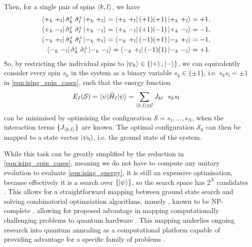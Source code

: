 Then, for a single pair of spins ${ \langle k, l \rangle }$, we have
\begin{equation}
    \label{eqn:ising_spin_cases}
    \begin{split}
        \bra{+_{k} \ +_{l} } \hat{\sigma}^{z}_{k} \ \hat{\sigma}^z_{l}  \ket{+_{k} \ +_{l} } =  \bra{+_{k} \ +_{l} } (+1)(+1) \ket{+_{k} \ +_{l} } = +1, \\
        \bra{+_{k} \ -_{l} } \hat{\sigma}^{z}_{k} \ \hat{\sigma}^z_{l} \ket{+_{k} \ -_{l} } = \bra{+_{k} \ -_{l} } (+1)(-1) \ket{+_{k} \ -_{l} } = -1 , \\
        \bra{-_{k} \ +_{l} } \hat{\sigma}^{z}_{k} \ \hat{\sigma}^z_{l} \ket{-_{k} \ +_{l} } = \bra{-_{k} \ +_{l} } (-1)(+1) \ket{-_{k} \ +_{l} } = -1, \\
        \bra{-_{k} \ -_{l} } \hat{\sigma}^{z}_{k} \ \hat{\sigma}^z_{l} \ket{-_{k} \ -_{l} } = \bra{-_{k} \ +_{l} } (-1)(1) \ket{-_{k} \ -_{l} } = +1. \\
    \end{split}
\end{equation}
So, by restricting the individual spins to $\ket{\psi_k} \in \{\ket{+}, \ket{-}\}$, 
    we can equivalently consider every spin $s_k$ in the system
    as a binary variable $s_k \in \{\pm 1\}$,
    i.e. $s_k s_l = \pm 1$ in \cref{eqn:ising_spin_cases},
    such that the energy function
\begin{equation}
    \label{eqn:ising_energy}
    E_I(\mathcal{S}) = \braket{ \psi | \hat{H}_I | \psi } = \sum\limits_{{ \langle k, l \rangle } \in { \mathcal{C}}} J_{kl} \ \ s_k s_l
\end{equation}
    can be minimised by optimising the configuration $\mathcal{S} = s_1, \dots, s_N$, when the interaction terms $\{J_{{ \langle k, l \rangle }}\}$ are known.
The optimal configuration $\mathcal{S}_0$ can then be mapped to a 
    state vector $\ket{\psi_0}$, i.e. the ground state of the system. 
\par 

While this task can be greatly simplified by the reduction in \cref{eqn:ising_spin_cases}, 
    meaning we do not have to compute any unitary evolution to evaluate \cref{eqn:ising_energy},
    it is still an expensive optimisation, because effectively it is a search over $\{ \ket{\psi }\}$, 
    so the search space has $2^N$ candidates \cite{onsager1944crystal, barahona1982computational}. 
This allows for a straightforward mapping between ground state search 
    and solving combinatorial optimsiation algorithms, namely , 
    known to be NP-complete \cite{garey1979computers}, 
    allowing for proposed advantage in mapping computationally challenging problems to quantum hardware \cite{lucas2014ising}. 
This mapping underlies ongoing research into quantum annealing as a computational platform capable of providing 
    advantage for a specific family of problems \cite{santoro2006optimization, bapst2013quantum, johnson2011quantum}. 
\par

